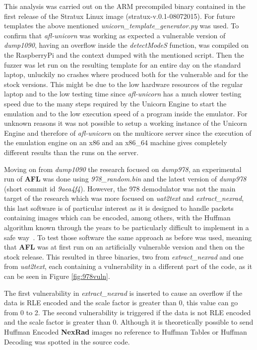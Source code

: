 \documentclass[../main.tex]{subfiles}
\begin{document}
This analysis was carried out on the ARM precompiled binary contained in the
first release of the Stratux Linux image (stratux-v.0.1-08072015). For future
templates the above mentioned \textit{unicorn\_template\_generator.py} was used.
To confirm that \textit{afl-unicorn} was working as expected a vulnerable
version of \textit{dump1090}, having an overflow inside the \textit{detectModeS}
function, was compiled on the RaspberryPi and the context dumped with the
mentioned script. Then the fuzzer was let run on the resulting template for an entire day on the standard laptop, unluckily no crashes where produced both for the vulnerable and for the stock versions. This might be due to the low hardware
resources of the regular laptop and to the low testing time since
\textit{afl-unicorn} has a much slower testing speed due to the many steps
required by the Unicorn Engine to start the emulation and to the low execution speed of a program inside the emulator. For unknown reasons it was not possible to setup a working instance of the Unicorn Engine and therefore of \textit{afl-unicorn} on the multicore server since the execution of the emulation engine on an x86 and an x86\_64 machine gives completely different results than the runs on the server.

Moving on from \textit{dump1090} the research focused on \textit{dump978}, an
experimental run of \textbf{AFL} was done using \textit{978\_random.bin} and the
latest version of \textit{dump978} (short commit id \textit{9aea4f4}). However,
the 978 demodulator was not the main target of the research which was more
focused on \textit{uat2text} and \textit{extract\_nexrad}, this last software is
of particular interest as it is designed to handle packets containing images
which can be encoded, among others, with the Huffman algorithm known through
the years to be particularly difficult to implement in a safe way~\cite{cve20176890, cve20074537}. To test those software the same approach as
before was used, meaning that \textbf{AFL} was at first run on an artificially
vulnerable version and then on the stock release. This resulted in three
binaries, two from \textit{extract\_nexrad} and one from \textit{uat2text}, each
containing a vulnerability in a different part of the code, as it can be seen in
Figure \ref{fig:978vuln}.

The first vulnerability in \textit{extract\_nexrad} is inserted to cause an
overflow if the data is RLE encoded and the scale factor is greater than 0, this
value can go from 0 to 2. The second vulnerability is triggered if the data is
not RLE encoded and the scale factor is greater than 0. Although it is
theoretically possible to send Huffman Encoded \textbf{NexRad} images no
reference to Huffman Tables or Huffman Decoding was spotted in the source code.
\end{document}
